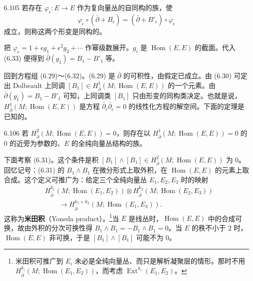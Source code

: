 \begin{definition}{6.105}
  若存在 $\varphi_\epsilon\colon E\to E$ 作为复向量丛的自同构的族，使
  \begin{equation}
    \varphi_\epsilon\circ(\bar\partial+B_\epsilon)=(\bar\partial+B'_\epsilon)\circ\varphi_\epsilon \tag{6.33}
  \end{equation}
  成立，则称这两个形变是同构的。
\end{definition}

把 $\varphi_\epsilon=1+\epsilon g_1+\epsilon^2g_2+\cdots$ 作幂级数展开。$g_i$ 是 $\operatorname{Hom}(E,E)$ 的截面。代入 (6.33) 便得到 $\bar\partial(g_1)=B_1-B'_1$ 等。

回到方程组 (6.29)～(6.32)。(6.29) 是 $\bar\partial$ 的可积性，由假定已成立。由 (6.30) 可定出 Dolbeault 上同调 $[B_1]\in H^{1}_{\bar\partial}(M;\operatorname{Hom}(E,E))$ 的一个元素。由 $\bar\partial(g_1)=B_1-B'_1$ 可知，上同调类 $[B_1]$ 只由形变的同构类决定。也就是说，$H^{1}_{\bar\partial}(M;\operatorname{Hom}(E,E))$ 是方程 $\bar\partial_\epsilon\bar\partial_\epsilon=0$ 的线性化方程的解空间。下面的定理是已知的。

\begin{theorem}{6.106}
  若 $H^{2}_{\bar\partial}(M;\operatorname{Hom}(E,E))=0$，则存在以 $H^{1}_{\bar\partial}(M;\operatorname{Hom}(E,E))=0$ 的 $0$ 的近旁为参数的、$E$ 的全纯向量丛结构的族。
\end{theorem}


下面考察 (6.31)。这个条件是积 $[B_1]\wedge[B_1]\in H^{2}_{\bar\partial}(M;\operatorname{Hom}(E,E))$ 为 0。回忆记号：(6.31) 的 $B_1\wedge B_1$ 在微分形式上取外积，在 $\operatorname{Hom}(E,E)$ 的元素上取合成。这个定义可推广为：给定三个全纯向量丛 $E_1,E_2,E_3$ 时的映射
\begin{align*}
  &H^{k_1}_{\bar\partial}(M;\operatorname{Hom}(E_1,E_2))\otimes H^{k_2}_{\bar\partial}(M;\operatorname{Hom}(E_2,E_3))\\
  &\qquad\longrightarrow H^{k_1+k_2}_{\bar\partial}(M;\operatorname{Hom}(E_1,E_3)).
\end{align*}
这称为\textbf{米田积}（Yoneda product）。\footnote{米田积可推广到 $E_i$ 未必是全纯向量丛、而只是解析凝聚层的情形。那时不用 $H^{k_i}_{\bar\partial}(M;\operatorname{Hom}(E_1,E_2))$，而考虑 $\operatorname{Ext}^{k_i}(E_1,E_2)$。}当 $E$ 是线丛时，$\operatorname{Hom}(E,E)$ 中的合成可换，故由外积的分次可换性得 $B_1\wedge B_1=-B_1\wedge B_1=0$。当 $E$ 的秩不小于 2 时，$\operatorname{Hom}(E,E)$ 非可换，于是 $[B_1]\wedge[B_1]$ 可能不为 0。

